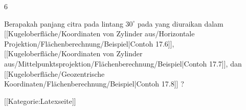 {6}
{

Berapakah panjang citra
 pada lintang $30^\circ$
pada
yang diuraikan dalam
[[Kugeloberfläche/Koordinaten von Zylinder aus/Horizontale Projektion/Flächenberechnung/Beispiel|Contoh 17.6]],
[[Kugeloberfläche/Koordinaten von Zylinder aus/Mittelpunktsprojektion/Flächenberechnung/Beispiel|Contoh 17.7]],
dan
[[Kugeloberfläche/Geozentrische Koordinaten/Flächenberechnung/Beispiel|Contoh 17.8]]
 {} {?}

}
{} {}

 [[Kategorie:Latexseite]]
